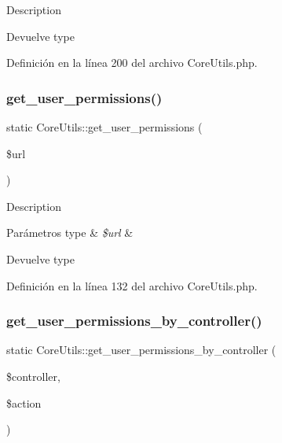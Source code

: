Description \begin{DoxyReturn}{Devuelve}
type 
\end{DoxyReturn}


Definición en la línea 200 del archivo Core\+Utils.\+php.

\mbox{\label{class_core_utils_ae5603ae99ba9ffe573bca46e834e3c23}} 
\subsubsection{\texorpdfstring{get\_user\_permissions()}{get\_user\_permissions()}}
{\footnotesize\ttfamily static Core\+Utils\+::get\+\_\+user\+\_\+permissions (\begin{DoxyParamCaption}\item[{}]{\$url }\end{DoxyParamCaption})\hspace{0.3cm}{\ttfamily [static]}}

Description 
\begin{DoxyParams}[1]{Parámetros}
type & {\em \$url} & \\
\hline
\end{DoxyParams}
\begin{DoxyReturn}{Devuelve}
type 
\end{DoxyReturn}


Definición en la línea 132 del archivo Core\+Utils.\+php.

\mbox{\label{class_core_utils_a10d5b2d56fd4d1109e8de78c5facaa7c}} 
\subsubsection{\texorpdfstring{get\_user\_permissions\_by\_controller()}{get\_user\_permissions\_by\_controller()}}
{\footnotesize\ttfamily static Core\+Utils\+::get\+\_\+user\+\_\+permissions\+\_\+by\+\_\+controller (\begin{DoxyParamCaption}\item[{}]{\$controller,  }\item[{}]{\$action }\end{DoxyParamCaption})\hspace{0.3cm}{\ttfamily [static]}}

